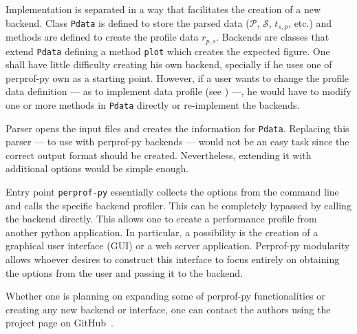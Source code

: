 Implementation is separated in a way that facilitates the creation of a
new backend.
Class {\tt Pdata} is defined to store the parsed data ($\mathcal{P}$,
$\mathcal{S}$, $t_{s,p}$, etc.) and  methods are defined to create the profile data
$r_{p,s}$.
Backends are classes that extend {\tt Pdata} defining a method {\tt plot}
which creates the expected figure.
One shall have little difficulty creating his own backend, specially if he
uses one of perprof-py own as a starting point.
However, if a user wants to change the profile data definition --- as
to implement  data profile (see \cite{bib:more2009benchmarking}) ---, he would have to modify
one or more methods in {\tt Pdata} directly or re-implement the backends.

Parser opens the input files and creates the information for {\tt Pdata}.
Replacing this parser --- to use with perprof-py backends --- would not be an easy task
since the correct output format should be created.  Nevertheless,
extending it with additional options would be simple enough.

Entry point {\tt perprof-py} essentially collects the options from the command
line and calls the specific backend profiler. This can be completely bypassed
by calling the backend directly. This allows one to create a performance
profile from another python application. In particular, a possibility is the
creation of a graphical user interface (GUI)
or a web server application. Perprof-py modularity 
allows whoever desires to construct this interface to focus entirely on
obtaining the options from the user and passing it to the backend.

Whether one is planning on expanding some of perprof-py functionalities or creating any
new backend or interface, one can contact the authors using the project page on
GitHub~\cite{url:perprof-py}.


